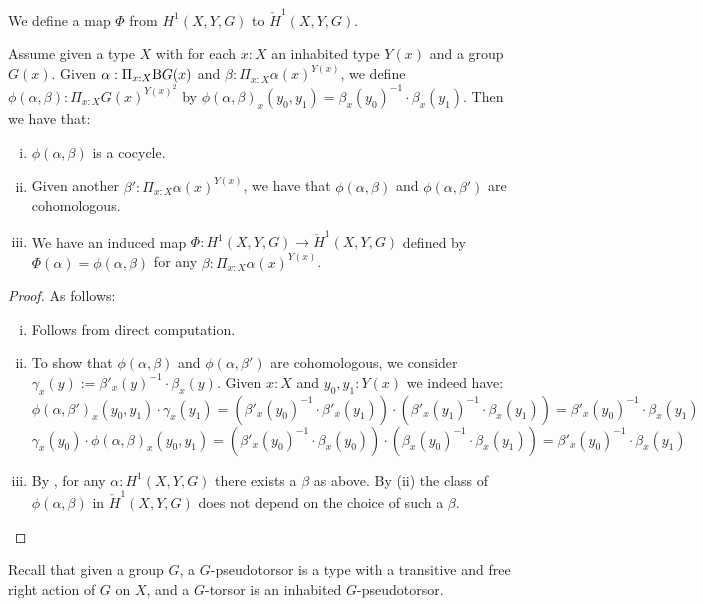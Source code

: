 

We define a map $\Phi$ from $H^1(X,Y,G)$ to $\check{H}^1(X,Y,G)$.

\begin{lemma}\label{phi-well-defined}
Assume given a type $X$ with for each $x:X$ an inhabited type $Y(x)$ and a group $G(x)$. Given $\alpha:\Pi_{x:X}\mathrm{B} G(x)$ and $\beta:\Pi_{x:X}\alpha(x)^{Y(x)}$, we define $\phi(\alpha,\beta):\Pi_{x:X}G(x)^{Y(x)^2}$ by $\phi(\alpha,\beta)_x(y_0,y_1) = \beta_x(y_0)^{-1}\cdot\beta_x(y_1)$. Then we have that:

\begin{enumerate}[(i)]
\item $\phi(\alpha,\beta)$ is a cocycle.
\item Given another $\beta':\Pi_{x:X}\alpha(x)^{Y(x)}$, we have that $\phi(\alpha,\beta)$ and $\phi(\alpha,\beta')$ are cohomologous.
\item We have an induced map $\Phi : H^1(X,Y,G)\to \check{H}^1(X,Y,G)$ defined by $\Phi(\alpha) = \phi(\alpha,\beta)$ for any $\beta:\Pi_{x:X}\alpha(x)^{Y(x)}$.
\end{enumerate}
\end{lemma}

\begin{proof}
As follows:

\begin{enumerate}[(i)]
\item Follows from direct computation.
\item To show that $\phi(\alpha,\beta)$ and $\phi(\alpha,\beta')$ are cohomologous, we consider $\gamma_x(y) := \beta'_x(y)^{-1}\cdot\beta_x(y)$. Given $x:X$ and $y_0,y_1:Y(x)$ we indeed have:
\[\phi(\alpha,\beta')_x(y_0,y_1)\cdot\gamma_x(y_1) = (\beta'_x(y_0)^{-1}\cdot \beta'_x(y_1))\cdot (\beta'_x(y_1)^{-1}\cdot\beta_x(y_1)) = \beta'_x(y_0)^{-1}\cdot\beta_x(y_1)\]
\[\gamma_x(y_0)\cdot\phi(\alpha,\beta)_x(y_0,y_1) = (\beta'_x(y_0)^{-1}\cdot \beta_x(y_0))\cdot(\beta_x(y_0)^{-1}\cdot\beta_x(y_1)) = \beta'_x(y_0)^{-1}\cdot\beta_x(y_1)\]
\item By , for any $\alpha:H^1(X,Y,G)$ there exists a $\beta$ as above. By (ii) the class of $\phi(\alpha,\beta)$ in $\check{H}^1(X,Y,G)$ does not depend on the choice of such a $\beta$.
\end{enumerate}
\end{proof}
\begin{definition}
Recall that given a group $G$, a $G$-pseudotorsor is a type with a transitive and free right action of $G$ on $X$, and a $G$-torsor is an inhabited $G$-pseudotorsor.
\end{definition}

